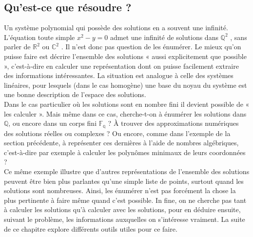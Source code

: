 \subsection{ Qu’est-ce que résoudre ?}
Un système polynomial qui possède des solutions en a souvent une infinité.
L’équation toute simple $x^{2} - y = 0$ admet une infinité de solutions dans $\mathbb{Q}^{2}$ , sans
parler de $\mathbb{R}^{2}$ ou $\mathbb{C}^{2}$ . Il n’est donc pas question de les énumérer. Le mieux qu’on
puisse faire est décrire l’ensemble des solutions « aussi explicitement que possible »,
c’est-à-dire en calculer une représentation dont on puisse facilement extraire des
informations intéressantes. La situation est analogue à celle des systèmes linéaires,
pour lesquels (dans le cas homogène) une base du noyau du système est une bonne
description de l’espace des solutions.
\\
Dans le cas particulier où les solutions sont en nombre fini il devient possible
de « les calculer ». Mais même dans ce cas, cherche-t-on à énumérer les solutions
dans $\mathbb{Q}$, ou encore dans un corps fini $\mathbb{F_{q}}$ ? À trouver des approximations numériques
des solutions réelles ou complexes ? Ou encore, comme dans l’exemple de la section
précédente, à représenter ces dernières à l’aide de nombres algébriques, c’est-à-dire
par exemple à calculer les polynômes minimaux de leurs coordonnées ?
\\

Ce même exemple illustre que d’autres représentations de l’ensemble des
solutions peuvent être bien plus parlantes qu’une simple liste de points, surtout
quand les solutions sont nombreuses. Ainsi, les énumérer n’est pas forcément la
chose la plus pertinente à faire même quand c’est possible. In fine, on ne cherche
pas tant à calculer les solutions qu’à calculer avec les solutions, pour en déduire
ensuite, suivant le problème, les informations auxquelles on s’intéresse vraiment.
La suite de ce chapitre explore différents outils utiles pour ce faire.
